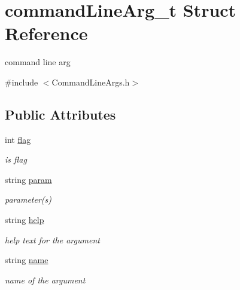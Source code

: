 \hypertarget{structcommandLineArg__t}{}\section{command\+Line\+Arg\+\_\+t Struct Reference}
\label{structcommandLineArg__t}


command line arg  




{\ttfamily \#include $<$Command\+Line\+Args.\+h$>$}

\subsection*{Public Attributes}
\begin{DoxyCompactItemize}
\item 
\mbox{\label{structcommandLineArg__t_a3db58af8143edf6cdee0c6af90c02bb4}} 
int \hyperlink{structcommandLineArg__t_a3db58af8143edf6cdee0c6af90c02bb4}{flag}
\begin{DoxyCompactList}\small\item\em is flag \end{DoxyCompactList}\item 
\mbox{\label{structcommandLineArg__t_a71b0eabcff73ed6f189119de3e179f1e}} 
string \hyperlink{structcommandLineArg__t_a71b0eabcff73ed6f189119de3e179f1e}{param}
\begin{DoxyCompactList}\small\item\em parameter(s) \end{DoxyCompactList}\item 
\mbox{\label{structcommandLineArg__t_ab8d597b3f07f9fe0d09bacba036cb1a6}} 
string \hyperlink{structcommandLineArg__t_ab8d597b3f07f9fe0d09bacba036cb1a6}{help}
\begin{DoxyCompactList}\small\item\em help text for the argument \end{DoxyCompactList}\item 
\mbox{\label{structcommandLineArg__t_ace90133da5e170fa09b6d1220dbaf9f7}} 
string \hyperlink{structcommandLineArg__t_ace90133da5e170fa09b6d1220dbaf9f7}{name}
\begin{DoxyCompactList}\small\item\em name of the argument \end{DoxyCompactList}\item 

\end{DoxyCompactItemize}
